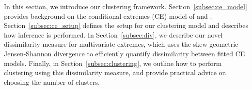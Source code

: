 \documentclass[12pt,compact]{article}
\newcommand{\JSGa}{\mathop{\mathrm{JS}^{\mathrm{G}_{\lambda}}}\nolimits}
\begin{document}
In this section, we introduce our clustering framework. %
Section~\ref{subsec:ce_model} provides background on the conditional extremes (CE) model of \citet{Heffernan2004} and \citet{Keef2013}. %
Section~\ref{subsec:ce_setup} defines the setup for our clustering model and describes how inference is performed.
In Section~\ref{subsec:div}, we describe our novel dissimilarity measure for multivariate extremes, which uses the skew-geometric Jensen-Shannon divergence to efficiently quantify dissimilarity between fitted CE models.
Finally, in Section~\ref{subsec:clustering}, we outline how to perform clustering using this dissimilarity measure, and provide practical advice on choosing the number of clusters.
\end{document}

